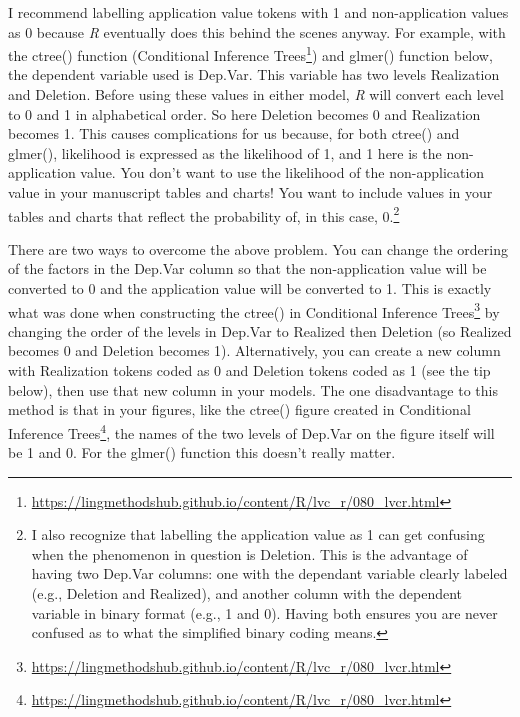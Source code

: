 \documentclass[
  10pt,
  letterpaper]{article}
\renewcommand\texttt[1]{{\ttfamily\color{BrickRed}#1}}
\DeclareRobustCommand{\href}[2]{#2\footnote{\url{#1}}}
\begin{document}
I recommend labelling application value tokens with \texttt{1} and
non-application values as \texttt{0} because \emph{R} eventually does
this behind the scenes anyway. For example, with the \texttt{ctree()}
function
(\href{https://lingmethodshub.github.io/content/R/lvc_r/080_lvcr.html}{Conditional
Inference Trees}) and \texttt{glmer()} function below, the dependent
variable used is \texttt{Dep.Var}. This variable has two levels
\texttt{Realization} and \texttt{Deletion}. Before using these values in
either model, \emph{R} will convert each level to \texttt{0} and
\texttt{1} in alphabetical order. So here \texttt{Deletion} becomes
\texttt{0} and \texttt{Realization} becomes \texttt{1}. This causes
complications for us because, for both \texttt{ctree()} and
\texttt{glmer()}, likelihood is expressed as the likelihood of
\texttt{1}, and \texttt{1} here is the non-application value. You don't
want to use the likelihood of the non-application value in your
manuscript tables and charts! You want to include values in your tables
and charts that reflect the probability of, in this case,
\texttt{0}.\footnote{I also recognize that labelling the application
  value as \texttt{1} can get confusing when the phenomenon in question
  is \texttt{Deletion}. This is the advantage of having two
  \texttt{Dep.Var} columns: one with the dependant variable clearly
  labeled (e.g., \texttt{Deletion} and \texttt{Realized}), and another
  column with the dependent variable in binary format (e.g., \texttt{1}
  and \texttt{0}). Having both ensures you are never confused as to what
  the simplified binary coding means.}

There are two ways to overcome the above problem. You can change the
ordering of the factors in the \texttt{Dep.Var} column so that the
non-application value will be converted to \texttt{0} and the
application value will be converted to \texttt{1}. This is exactly what
was done when constructing the \texttt{ctree()} in
\href{https://lingmethodshub.github.io/content/R/lvc_r/080_lvcr.html}{Conditional
Inference Trees} by changing the order of the levels in \texttt{Dep.Var}
to \texttt{Realized} then \texttt{Deletion} (so \texttt{Realized}
becomes \texttt{0} and \texttt{Deletion} becomes \texttt{1}).
Alternatively, you can create a new column with \texttt{Realization}
tokens coded as \texttt{0} and \texttt{Deletion} tokens coded as
\texttt{1} (see the tip below), then use that new column in your models.
The one disadvantage to this method is that in your figures, like the
\texttt{ctree()} figure created in
\href{https://lingmethodshub.github.io/content/R/lvc_r/080_lvcr.html}{Conditional
Inference Trees}, the names of the two levels of \texttt{Dep.Var} on the
figure itself will be \texttt{1} and \texttt{0}. For the
\texttt{glmer()} function this doesn't really matter.
\end{document}
